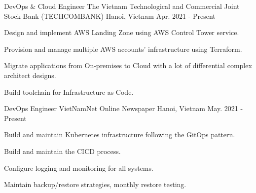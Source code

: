 

\begin{cventries}

  \cventry
    {DevOps \& Cloud Engineer} %
    {The Vietnam Technological and Commercial Joint Stock Bank (TECHCOMBANK)} %
    {Hanoi, Vietnam} %
    {Apr. 2021 - Present} %
    {
      \begin{cvitems} %
        \item {Design and implement AWS Landing Zone using AWS Control Tower service.}
        \item {Provision and manage multiple AWS accounts' infrastructure using Terraform.}
        \item {Migrate applications from On-premises to Cloud with a lot of differential complex architect designs.}
        \item {Build toolchain for Infrastructure as Code.}
      \end{cvitems}
    }
    
  \cventry
    {DevOps Engineer} %
    {VietNamNet Online Newspaper} %
    {Hanoi, Vietnam} %
    {May. 2021 - Present} %
    {
      \begin{cvitems} %
        \item {Build and maintain Kubernetes infrastructure following the GitOps pattern.}
        \item {Build and maintain the CICD process.}
        \item {Configure logging and monitoring for all systems.}
        \item {Maintain backup/restore strategies, monthly restore testing.}
      \end{cvitems}
    }


\end{cventries}
